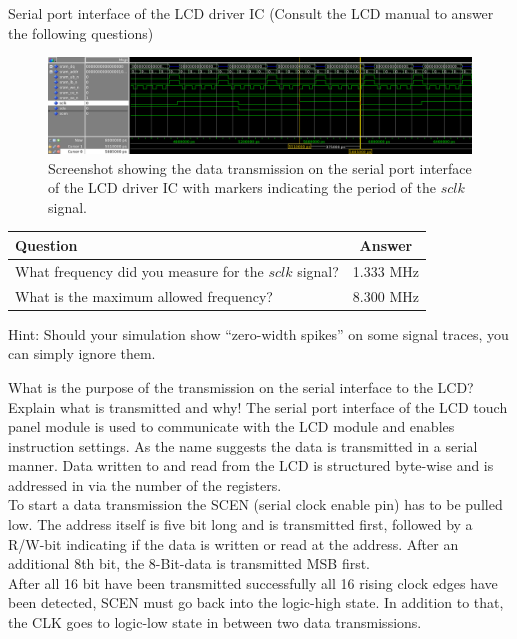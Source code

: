 \documentclass[10pt,a4paper,titlepage,oneside]{article}
\begin{document}
\begin{qa}{Serial port interface of the LCD driver IC (Consult the LCD manual to answer the following questions)}

\begin{figure}[h!]
	\centering
	\includegraphics[width=1.0\linewidth]{dia/Subtask4.png}
	\caption{Screenshot showing the data transmission on the serial port interface of the LCD driver IC with markers indicating the period of the $sclk$ signal.}
\end{figure}

\begin{center}
\begin{tabular}{lc}
	\hline
	Question                                               & Answer \\\hline\hline
	What frequency did you measure for the $sclk$ signal?  & 1.333 MHz \\
	What is the maximum allowed frequency?                 & 8.300 MHz \\\hline
\end{tabular}
\end{center}

Hint: Should your simulation show ``zero-width spikes'' on some signal traces, you can simply ignore them.
\end{qa}


\begin{qa}{What is the purpose of the transmission on the serial interface to the LCD? Explain what is transmitted and why!}
The serial port interface of the LCD touch panel module is used to communicate with the LCD module and enables instruction settings. As the name suggests the data is transmitted in a serial manner. Data written to and read from the LCD is structured byte-wise and is addressed in via the number of the registers.\\
To start a data transmission the SCEN (serial clock enable pin) has to be pulled low. The address itself is five bit long and is transmitted first, followed by a R/W-bit indicating if the data is written or read at the address. After an additional 8th bit, the 8-Bit-data is transmitted MSB first.\\
After all 16 bit have been transmitted successfully all 16 rising clock edges have been detected, SCEN must go back into the logic-high state. In addition to that, the CLK goes to logic-low state in between two data transmissions.\\
\end{qa}
\end{document}

